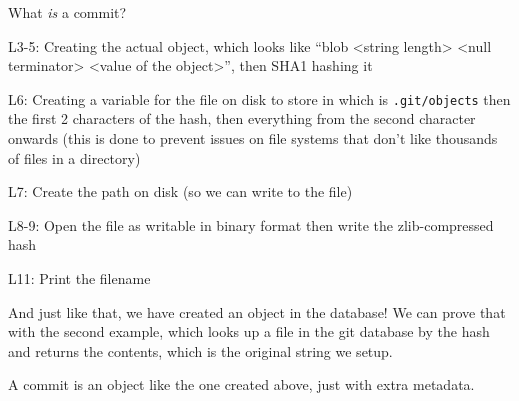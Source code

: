 \documentclass[presentation]{beamer}
\begin{document}
\begin{frame}[label={sec:orgd59d870},fragile]{What \emph{is} a commit?}
{L3-5: Creating the actual object, which looks like ``blob <string length> <null terminator> <value of the object>'', then SHA1 hashing it

L6: Creating a variable for the file on disk to store in which is \texttt{.git/objects} then the first 2 characters of the hash, then everything from the second character onwards (this is done to prevent issues on file systems that don't like thousands of files in a directory)

L7: Create the path on disk (so we can write to the file)

L8-9: Open the file as writable in binary format then write the zlib-compressed hash

L11: Print the filename

And just like that, we have created an object in the database! We can prove that with the second example, which looks up a file in the git database by the hash and returns the contents, which is the original string we setup.

A commit is an object like the one created above, just with extra metadata.

\normalsize}
\end{frame}
\end{document}
